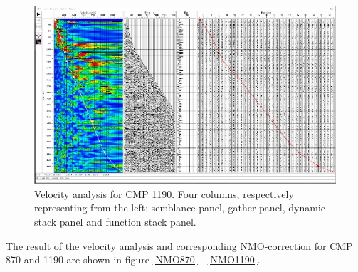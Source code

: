\documentclass[10pt,a4paper]{article}
\begin{document}
\begin{figure}[H]
\includegraphics[width=\textwidth]{Velo_anal_1190.jpg}
\caption{Velocity analysis for CMP 1190. Four columns, respectively representing from the left: semblance panel, gather panel, dynamic stack panel and function stack panel.}
\label{VA1190}
\end{figure}

\noindent The result of the velocity analysis and corresponding NMO-correction for CMP 870 and 1190 are shown in figure \ref{NMO870} - \ref{NMO1190}.
\end{document}
